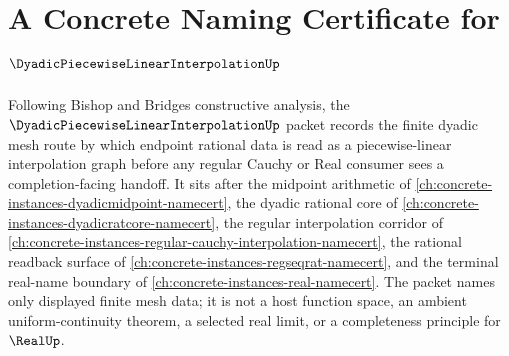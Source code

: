 \chapter{A Concrete Naming Certificate for $\DyadicPiecewiseLinearInterpolationUp$}
\label{ch:concrete-instances-dyadic-piecewise-linear-interpolation-namecert}

Following Bishop and Bridges constructive analysis, the $\DyadicPiecewiseLinearInterpolationUp$ packet records the finite dyadic mesh route by which endpoint rational data is read as a piecewise-linear interpolation graph before any regular Cauchy or Real consumer sees a completion-facing handoff. It sits after the midpoint arithmetic of \autoref{ch:concrete-instances-dyadicmidpoint-namecert}, the dyadic rational core of \autoref{ch:concrete-instances-dyadicratcore-namecert}, the regular interpolation corridor of \autoref{ch:concrete-instances-regular-cauchy-interpolation-namecert}, the rational readback surface of \autoref{ch:concrete-instances-regseqrat-namecert}, and the terminal real-name boundary of \autoref{ch:concrete-instances-real-namecert}. The packet names only displayed finite mesh data; it is not a host function space, an ambient uniform-continuity theorem, a selected real limit, or a completeness principle for $\RealUp$.

